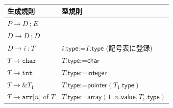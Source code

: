 \documentclass[dvipdfmx]{jarticle}
\newcommand{\ttsc}{\texttt{;}}
\newcommand{\ttcol}{\texttt{:}}
\newcommand{\tteq}{\texttt{=}}
\newcommand{\ttasgn}{\ttcol\tteq}
\begin{document}
\begin{tabular}{|l|l|}\hline
生成規則 & 型規則\\\hline
$P\rightarrow D\ \ttsc\ E$ & \\
$D\rightarrow D\ \ttsc\ D$ & \\
$D\rightarrow i\ \ttcol\ T$ & $i.\mathsf{type}\ttasgn T.\mathsf{type}$ (記号表に登録)\\
$T\rightarrow \texttt{char}$ & $T.\mathsf{type}\ttasgn\textsf{char}$\\
$T\rightarrow \texttt{int}$ & $T.\mathsf{type}\ttasgn\textsf{integer}$\\
$T\rightarrow \texttt{\&}T_1$ & $T.\mathsf{type}\ttasgn\textsf{pointer}(T_1.\textsf{type})$\\
$T\rightarrow \texttt{arr[}n\texttt{]}$ of $T$ & $T.\mathsf{type}\ttasgn
\mathsf{array}(1..n.\mathsf{value},T_1.\mathsf{type})$\\
\hline
\end{tabular}
\end{document}

